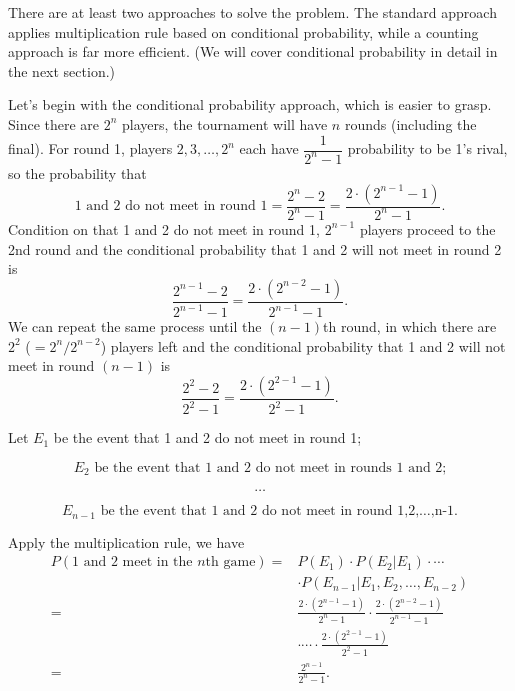 \begin{solution}
There are at least two approaches to solve the problem. The standard approach applies
multiplication rule based on conditional probability, while a counting approach is far more
efficient. (We will cover conditional probability in detail in the next section.)

Let's begin with the conditional probability approach, which is easier to grasp. Since there
are $2^n$ players, the tournament will have $n$ rounds (including the final). For round 1,
players $2,3,\ldots,2^n$ each have $\dfrac{1}{2^n-1}$ probability to be 1's rival, so the
probability that
\[
1\text{ and }2\text{ do not meet in round 1}
=\frac{2^n-2}{2^n-1}
=\frac{2\cdot(2^{n-1}-1)}{2^n-1}.
\]
Condition on that 1 and 2 do not meet in round 1, $2^{n-1}$ players proceed to the 2nd
round and the conditional probability that 1 and 2 will not meet in round 2 is
\[
\frac{2^{n-1}-2}{2^{n-1}-1}
=\frac{2\cdot(2^{n-2}-1)}{2^{n-1}-1}.
\]
We can repeat the same process until the $(n-1)$th round, in which there are
$2^2$ ($=2^n/2^{n-2}$) players left and the conditional probability that 1 and 2 will
not meet in round $(n-1)$ is
\[
\frac{2^2-2}{2^2-1}
=\frac{2\cdot(2^{2-1}-1)}{2^2-1}.
\]

Let $E_1$ be the event that 1 and 2 do not meet in round 1;

\[
E_2\text{ be the event that 1 and 2 do not meet in rounds 1 and 2;}
\]

\[
\ldots
\]

\[
E_{n-1}\text{ be the event that 1 and 2 do not meet in round 1,2,\ldots,n-1.}
\]

Apply the multiplication rule, we have
\[
\begin{aligned}
P(1\text{ and }2\text{ meet in the }n\text{th game})
={}&P(E_1)\cdot P(E_2\vert E_1)\cdot\cdots\\
&\cdot P(E_{n-1}\vert E_1,E_2,\ldots,E_{n-2})\\
={}&\frac{2\cdot(2^{n-1}-1)}{2^n-1}
\cdot\frac{2\cdot(2^{n-2}-1)}{2^{n-1}-1}\\
&\cdot\cdots\cdot\frac{2\cdot(2^{2-1}-1)}{2^2-1}\\
={}&\frac{2^{n-1}}{2^n-1}.
\end{aligned}
\]

\end{solution}

